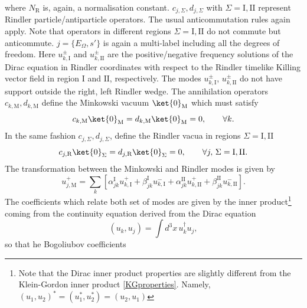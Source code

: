 where $N_\text{R}$ is, again, a normalisation constant.  $c_{j,\Sigma},d_{j,\Sigma}$ with $\Sigma=\text{I},\text{II}$ represent Rindler particle/antiparticle operators. The usual anticommutation rules again apply. Note that operators in different regions $\Sigma=\text{I},\text{II}$ do not commute but anticommute. $j=\{E_\Omega,s'\}$ is again a multi-label including all the degrees of freedom. Here  $u^\pm_{k,\text{I}}$ and $u^\pm_{k,\text{II}}$  are the positive/negative frequency solutions of the Dirac equation in Rindler coordinates with respect to the Rindler timelike Killing vector field in region $\text{I}$ and $\text{II}$, respectively. The modes  $u^\pm_{k,\text{I}}$, $u^\pm_{k,\text{II}}$  do not have support outside the right, left Rindler wedge. 
The annihilation operators $c_{k,\text{M}},d_{k,\text{M}} $ define the Minkowski vacuum $\ket{0}_\text{M}$ which must satisfy
\begin{equation}
c_{k,\text{M}}\ket{0}_\text{M}= d_{k,\text{M}}\ket{0}_\text{M}=0, \qquad \forall k.
\end{equation}
In the same fashion $c_{j,\Sigma},d_{j,\Sigma}$, define the Rindler vacua in regions $\Sigma=\text{I},\text{II}$
\begin{equation}
c_{j,\text{\text{R}}}\ket{0}_\Sigma=d_{j,\text{\text{R}}}\ket{0}_\Sigma=0, \qquad \forall j, \, \Sigma=\text{I},\text{II}.
\end{equation}	
The transformation  between the Minkowski and Rindler modes is given by
\begin{equation}
 u^+_{j,\text{M}}=\sum_k\left[\alpha^\text{I}_{jk}u^+_{k,\text{I}} + \beta^{\text{I}}_{jk} u^-_{k,\text{I}}+\alpha^\text{II}_{jk}u^+_{k,\text{II}}+\beta^{\text{II}}_{jk} u^-_{k,\text{II}}\right].
\end{equation}
The coefficients which relate both set of modes are given by the inner product\footnote{Note that the Dirac inner product properties are slightly different from the Klein-Gordon inner product \eqref{KGproperties}. Namely, $(u_1,u_2)^*=(u_1^*,u_2^*)=(u_2,u_1)$} coming from the continuity equation derived from the Dirac equation
\begin{equation}
(u_k,u_j)=\int d^3x\, u_k^\dagger u_j,
\end{equation}
so that he  Bogoliubov coefficients
